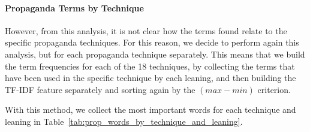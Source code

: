 \paragraph{Propaganda Terms by Technique}
However, from this analysis, it is not clear how the terms found relate to the specific propaganda techniques. For this reason, we decide to perform again this analysis, but for each propaganda technique separately.
This means that we build the term frequencies for each of the 18 techniques, by collecting the terms that have been used in the specific technique by each leaning, and then building the TF-IDF feature separately and sorting again by the $(max - min)$ criterion.

With this method, we collect the most important words for each technique and leaning in Table~\ref{tab:prop_words_by_technique_and_leaning}.

